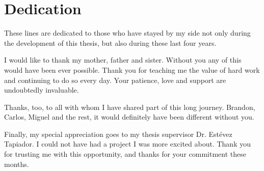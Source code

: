 \documentclass[12pt]{report} %
\begin{document}
\chapter*{Dedication}
\thispagestyle{plainnofancy}
\setcounter{page}{5}


These lines are dedicated to those who have stayed by my side not only during the development of this thesis, but also during these last four years.

I would like to thank my mother, father and sister. Without you any of this would have been ever possible. Thank you for teaching me the value of hard work and continuing to do so every day. Your patience, love and support are undoubtedly invaluable.

Thanks, too, to all with whom I have shared part of this long journey. Brandon, Carlos, Miguel and the rest, it would definitely have been different without you.

Finally, my special appreciation goes to my thesis supervisor Dr. Estévez Tapiador. I could not have had a project I was more excited about. Thank you for trusting me with this opportunity, and thanks for your commitment these months.



	\vfill

	\newpage
	\thispagestyle{empty}
	\mbox{}




\tableofcontents
\clearpage

\newpage
\thispagestyle{empty}
\mbox{}

\listoffigures


\newpage
\thispagestyle{empty}
\mbox{}

\listoftables

\newpage %
\thispagestyle{empty}
\mbox{}

\clearpage
{}
\pagestyle{fancy}

\renewcommand\_{\textunderscore\allowbreak}


















\clearpage
\pagestyle{plainnofancy}

\sloppy
\printbibliography



\end{document}
